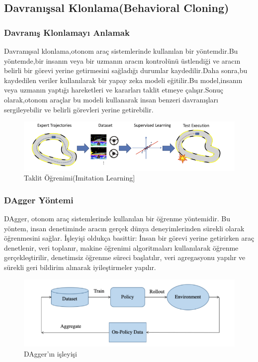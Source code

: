 \documentclass{article}
\begin{document}
\subsection{Davranışsal Klonlama(Behavioral Cloning)}
\subsubsection{Davranış Klonlamayı Anlamak}
Davranışsal klonlama,otonom araç sistemlerinde kullanılan bir yöntemdir.Bu yöntemde,bir insanın veya bir uzmanın aracın kontrolünü üstlendiği ve aracın belirli bir görevi yerine getirmesini sağladığı durumlar kaydedilir.Daha sonra,bu kaydedilen veriler kullanılarak bir yapay zeka modeli eğitilir.Bu model,insanın veya uzmanın yaptığı hareketleri ve kararları taklit etmeye çalışır.Sonuç olarak,otonom araçlar bu modeli kullanarak insan benzeri davranışları sergileyebilir ve belirli görevleri yerine getirebilir.

\begin{figure}[h]
  \centering
  \includegraphics[width=1.1\textwidth]{image/Resim58.PNG} %
\caption{Taklit Öğrenimi(Imitation Learning]\cite{Imitation}}
  \label{fig:cnnmimari}  
\end{figure}

\subsubsection{DAgger Yöntemi}
DAgger, otonom araç sistemlerinde kullanılan bir öğrenme yöntemidir. Bu yöntem, insan denetiminde aracın gerçek dünya deneyimlerinden sürekli olarak öğrenmesini sağlar. İşleyişi oldukça basittir: İnsan bir görevi yerine getirirken araç denetlenir, veri toplanır, makine öğrenimi algoritmaları kullanılarak öğrenme gerçekleştirilir, denetimsiz öğrenme süreci başlatılır, veri agregasyonu yapılır ve sürekli geri bildirim alınarak iyileştirmeler yapılır.


\begin{figure}[h]
  \centering
  \includegraphics[width=1.1\textwidth]{image/Resim60.PNG} %
\caption{DAgger'ın işleyişi\cite{prakash2020exploring}}
  \label{fig:cnnmimari}  
\end{figure}
\end{document}
